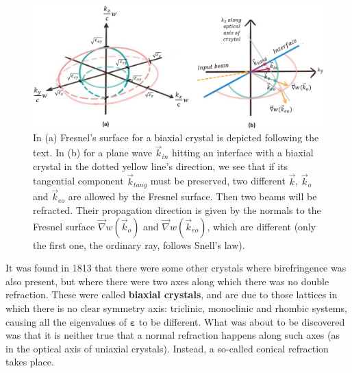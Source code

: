 \documentclass[11pt, a4paper, twoside]{article} %
\begin{document}
\begin{figure}[h!] 
     \centering 
    \includegraphics[width=0.82\linewidth]{uni.PNG}
    \caption{In (a) Fresnel's surface for a biaxial crystal is depicted following the text. In (b) for a plane wave $\vec{k}_{in}$ hitting an interface with a biaxial crystal in the dotted yellow line's direction, we see that if its tangential component $\vec{k}_{tang}$ must be preserved, two different $\vec{k}$, $\vec{k}_o$ and $\vec{k}_{eo}$ are allowed by the Fresnel surface. Then two beams will be refracted. Their propagation direction is given by the normals to the Fresnel surface $\vec{\nabla}w(\vec{k}_o)$ and $\vec{\nabla}w(\vec{k}_{eo})$, which are different (only the first one, the ordinary ray, follows Snell's law).\vspace{-0.5cm} }
        \label{fig:concentric1}
\end{figure}
It was found in 1813 that there were some other crystals where birefringence was also present, but where there were two axes along which there was no double refraction. These were called {\bf biaxial crystals}, and are due to those lattices in which there is no clear symmetry axis: triclinic, monoclinic and rhombic systems, causing all the eigenvalues of $\pmb{\varepsilon}$ to be different. What was about to be discovered was that it is neither true that a normal refraction happens along such axes (as in the optical axis of uniaxial crystals). Instead, a so-called conical refraction takes place.
\end{document}
